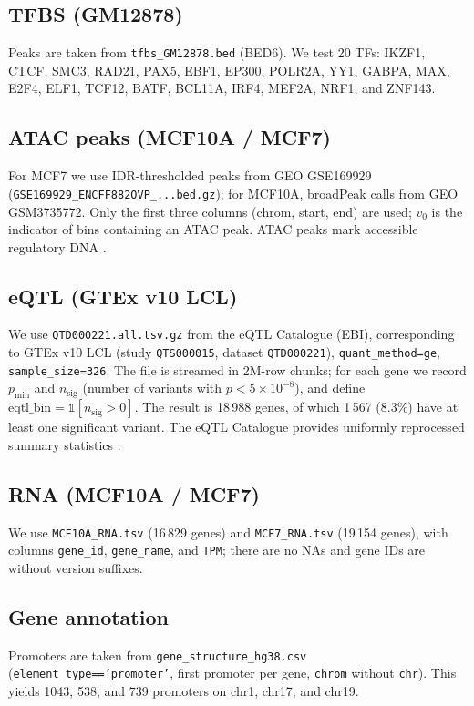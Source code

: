 \documentclass[11pt,a4paper]{article}
\begin{document}
\subsection{TFBS (GM12878)}
Peaks are taken from \texttt{tfbs\_GM12878.bed} (BED6). We test 20 TFs: IKZF1, CTCF, SMC3, RAD21, PAX5, EBF1, EP300, POLR2A, YY1, GABPA, MAX, E2F4, ELF1, TCF12, BATF, BCL11A, IRF4, MEF2A, NRF1, and ZNF143.

\subsection{ATAC peaks (MCF10A / MCF7)}
For MCF7 we use IDR-thresholded peaks from GEO GSE169929 (\texttt{GSE169929\_ENCFF882OVP\_...bed.gz}); for MCF10A, broadPeak calls from GEO GSM3735772. Only the first three columns (chrom, start, end) are used; $v_0$ is the indicator of bins containing an ATAC peak. ATAC peaks mark accessible regulatory DNA \cite{thurman2012}.

\subsection{eQTL (GTEx v10 LCL)}
We use \texttt{QTD000221.all.tsv.gz} from the eQTL Catalogue (EBI), corresponding to GTEx v10 LCL (study \texttt{QTS000015}, dataset \texttt{QTD000221}), \texttt{quant\_method=ge}, \texttt{sample\_size=326}. The file is streamed in 2M-row chunks; for each gene we record $p_{\min}$ and $n_{\mathrm{sig}}$ (number of variants with $p<5\times10^{-8}$), and define $\mathrm{eqtl\_bin} = \mathbb{1}[n_{\mathrm{sig}}>0]$. The result is 18\,988 genes, of which 1\,567 (8.3\%) have at least one significant variant. The eQTL Catalogue provides uniformly reprocessed summary statistics
\cite{kerimov2021}.

\subsection{RNA (MCF10A / MCF7)}
We use \texttt{MCF10A\_RNA.tsv} (16\,829 genes) and \texttt{MCF7\_RNA.tsv} (19\,154 genes), with columns \texttt{gene\_id}, \texttt{gene\_name}, and \texttt{TPM}; there are no NAs and gene IDs are without version suffixes.

\subsection{Gene annotation}
Promoters are taken from \texttt{gene\_structure\_hg38.csv} (\texttt{element\_type=='promoter'}, first promoter per gene, \texttt{chrom} without \texttt{chr}). This yields 1043, 538, and 739 promoters on chr1, chr17, and chr19.
\end{document}
